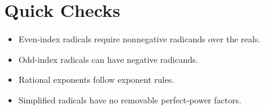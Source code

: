 \documentclass[11pt]{article}
\begin{document}
\section*{Quick Checks}
\begin{itemize}
  \item Even-index radicals require nonnegative radicands over the reals.
  \item Odd-index radicals can have negative radicands.
  \item Rational exponents follow exponent rules.
  \item Simplified radicals have no removable perfect-power factors.
\end{itemize}
\end{document}
